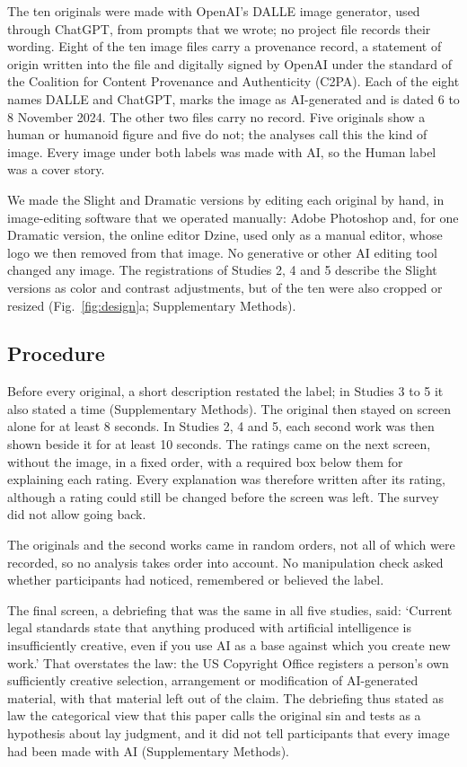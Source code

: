 The ten originals were made with OpenAI's DALL\textperiodcentered E image generator, used through ChatGPT, from prompts that we wrote; no project file records their wording. Eight of the ten image files carry a provenance record, a statement of origin written into the file and digitally signed by OpenAI under the standard of the Coalition for Content Provenance and Authenticity (C2PA). Each of the eight names DALL\textperiodcentered E and ChatGPT, marks the image as AI-generated and is dated 6 to 8 November 2024. The other two files carry no record. Five originals show a human or humanoid figure and five do not; the analyses call this the kind of image. Every image under both labels was made with AI, so the Human label was a cover story.

We made the Slight and Dramatic versions by editing each original by hand, in image-editing software that we operated manually: Adobe Photoshop and, for one Dramatic version, the online editor Dzine, used only as a manual editor, whose logo we then removed from that image. No generative or other AI editing tool changed any image. The registrations of Studies 2, 4 and 5 describe the Slight versions as color and contrast adjustments, but \XSImageCheckSlightReframedN{} of the ten were also cropped or resized (Fig.~\ref{fig:design}a; Supplementary Methods).

\subsection*{Procedure}

Before every original, a short description restated the label; in Studies 3 to 5 it also stated a time (Supplementary Methods). The original then stayed on screen alone for at least 8 seconds. In Studies 2, 4 and 5, each second work was then shown beside it for at least 10 seconds. The ratings came on the next screen, without the image, in a fixed order, with a required box below them for explaining each rating. Every explanation was therefore written after its rating, although a rating could still be changed before the screen was left. The survey did not allow going back.

The originals and the second works came in random orders, not all of which were recorded, so no analysis takes order into account. No manipulation check asked whether participants had noticed, remembered or believed the label.

The final screen, a debriefing that was the same in all five studies, said: `Current legal standards state that anything produced with artificial intelligence is insufficiently creative, even if you use AI as a base against which you create new work.' That overstates the law: the US Copyright Office registers a person's own sufficiently creative selection, arrangement or modification of AI-generated material, with that material left out of the claim.\cite{usco2023guidance,usco2025copyrightability} The debriefing thus stated as law the categorical view that this paper calls the original sin and tests as a hypothesis about lay judgment, and it did not tell participants that every image had been made with AI (Supplementary Methods).

